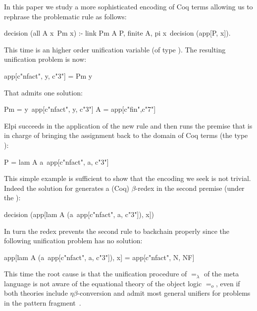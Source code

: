 \documentclass[sigconf,natbib=false]{acmart}
\newcommand{\U}{\ensuremath{=_o}}
\newcommand{\Ue}{\ensuremath{=_\lambda}}
\begin{document}
\noindent
In this paper we study a more sophisticated encoding of Coq terms allowing
us to rephrase the problematic rule as follows:

\begin{elpicode}
decision (all A x\ Pm x) :- link Pm A P, finite A,
  pi x\ decision (app[P, x]).
\end{elpicode}

\noindent
This time  is an higher order unification variable (of type
). The resulting unification problem is now:

\begin{elpicode}
app[c"nfact", y, c"3"] = Pm y
\end{elpicode}

\noindent
That admits one solution:

\begin{elpicode}
Pm = y\ app[c"nfact", y, c"3"]
A = app[c"fin",c"7"]
\end{elpicode}
  
\noindent
Elpi succeeds in the application of the new rule and then runs
the premise  that is in charge of bringing the
assignment back to the domain of Coq terms (the type ):

\begin{elpicode}
P = lam A a\ app[c"nfact", a, c"3"]
\end{elpicode}

\noindent
This simple example is sufficient to show that the encoding we seek
is not trivial. Indeed the solution for  generates a
(Coq) $\beta$-redex in the second premise (under the ):

\begin{elpicode}
decision (app[lam A (a\ app[c"nfact", a, c"3"]), x])
\end{elpicode}

\noindent
In turn the redex prevents the second rule to backchain properly since
the following unification problem has no solution:

\begin{elpicode}
app[lam A (a\ app[c"nfact", a, c"3"]), x] =
app[c"nfact", N, NF]
\end{elpicode}

\noindent
This time the root cause is that the unification procedure of \Ue{} of the
meta language is not aware of the equational theory of the object logic \U{},
even if both theories include $\eta\beta$-conversion and admit most general
unifiers for problems in the pattern fragment~\cite{miller92jsc}.
\end{document}
